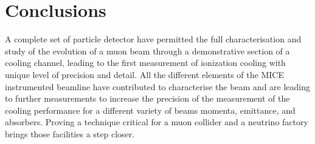 \graphicspath{{80-Conclusions/Figures/}}

\section{Conclusions}
\label{Sect:Conclusions}

A complete set of particle detector have permitted the full characterisation and study of the evolution of a muon beam through a demonstrative section of a cooling channel, leading to the first measurement of ionization cooling with unique level of precision and detail.
All the different elements of the MICE instrumented beamline have contributed to characterise the beam and are leading to further measurements to increase the precision of the measurement of the cooling performance for a different variety of beams momenta, emittance, and absorbers.
Proving a technique critical for a muon collider and a neutrino factory brings those facilities a step closer.
